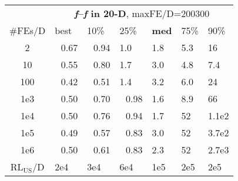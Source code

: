 \begin{tabular}{c|llllll}
 & \multicolumn{6}{|c}{\textbf{\textit{f}\raisebox{-0.35ex}{1}--\textit{f}\raisebox{-0.35ex}{24} in 20-D}, maxFE/D=200300}\\
\#FEs/D & best & 10\% & 25\% & \textbf{med} & 75\% & 90\%\\
2 & ~\,0.67 & ~\,0.94 & \hspace*{1ex}1.0 & \hspace*{1ex}1.8 & \hspace*{1ex}5.3 & 16\\
10 & ~\,0.55 & ~\,0.80 & \hspace*{1ex}1.7 & \hspace*{1ex}3.0 & \hspace*{1ex}4.8 & \hspace*{1ex}7.4\\
100 & ~\,0.42 & ~\,0.51 & \hspace*{1ex}1.4 & \hspace*{1ex}3.2 & \hspace*{1ex}6.0 & 24\\
1e3 & ~\,0.50 & ~\,0.70 & ~\,0.98 & \hspace*{1ex}1.6 & \hspace*{1ex}8.9 & 66\\
1e4 & ~\,0.50 & ~\,0.76 & ~\,0.94 & \hspace*{1ex}1.7 & 52 & 1.1e2\\
1e5 & ~\,0.49 & ~\,0.57 & ~\,0.83 & \hspace*{1ex}3.0 & 52 & 3.7e2\\
1e6 & ~\,0.50 & ~\,0.61 & ~\,0.83 & \hspace*{1ex}2.3 & 52 & 2.7e3\\
$\text{RL}_{\text{US}}$/D & 2e4 & 3e4 & 6e4 & 1e5 & 2e5 & 2e5
\end{tabular}

